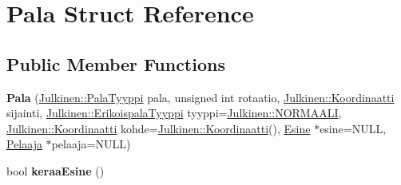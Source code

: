 \hypertarget{struct_pala}{}\section{Pala Struct Reference}
\label{struct_pala}
\subsection*{Public Member Functions}
\begin{DoxyCompactItemize}
\item 
\hypertarget{struct_pala_a45737786e7c2e42b097efac224117e4b}{}{\bfseries Pala} (\hyperlink{namespace_julkinen_a272c70e0503191a485c8a9cd4281e6f5}{Julkinen\+::\+Pala\+Tyyppi} pala, unsigned int rotaatio, \hyperlink{class_julkinen_1_1_koordinaatti}{Julkinen\+::\+Koordinaatti} sijainti, \hyperlink{namespace_julkinen_afc26052e09d0b2214f749492cc5fff19}{Julkinen\+::\+Erikoispala\+Tyyppi} tyyppi=\hyperlink{namespace_julkinen_afc26052e09d0b2214f749492cc5fff19a67d9c76baa2a4eec4ca132c15bd567b5}{Julkinen\+::\+N\+O\+R\+M\+A\+A\+L\+I}, \hyperlink{class_julkinen_1_1_koordinaatti}{Julkinen\+::\+Koordinaatti} kohde=\hyperlink{class_julkinen_1_1_koordinaatti}{Julkinen\+::\+Koordinaatti}(), \hyperlink{struct_esine}{Esine} $\ast$esine=N\+U\+L\+L, \hyperlink{struct_pelaaja}{Pelaaja} $\ast$pelaaja=N\+U\+L\+L)\label{struct_pala_a45737786e7c2e42b097efac224117e4b}

\item 
\hypertarget{struct_pala_a80712cfbb26beb9a995ec78a0cf391b2}{}bool {\bfseries keraa\+Esine} ()\label{struct_pala_a80712cfbb26beb9a995ec78a0cf391b2}

\end{DoxyCompactItemize}
